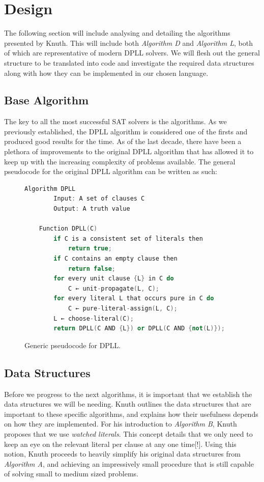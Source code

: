 \documentclass{article}
\begin{document}
\section{Design}
The following section will include analysing and detailing the algorithms presented by Knuth. This will include both
\textit{Algorithm D} and \textit{Algorithm L}, both of which are representative of modern DPLL solvers. We will flesh out the
general structure to be translated into code and investigate the required data structures along with how they can be implemented
in our chosen language.

\subsection{Base Algorithm}
The key to all the most successful SAT solvers is the algorithms. As we previously established, the DPLL algorithm is considered
one of the firsts and produced good results for the time. As of the last decade, there have been a plethora of improvements to the
original DPLL algorithm that has allowed it to keep up with the increasing complexity of problems available. The general
pseudocode for the original DPLL algorithm can be written as such:

\begin{figure}[h]
    \centering
    \begin{lstlisting}[language=C++]
    Algorithm DPLL
        Input: A set of clauses C
        Output: A truth value

    Function DPLL(C)
        if C is a consistent set of literals then
            return true;
        if C contains an empty clause then
            return false;
        for every unit clause {L} in C do
            C ← unit-propagate(L, C);
        for every literal L that occurs pure in C do
            C ← pure-literal-assign(L, C);
        L ← choose-literal(C);
        return DPLL(C AND {L}) or DPLL(C AND {not(L)});
    \end{lstlisting}
    \caption{Generic pseudocode for DPLL.}
\end{figure}

\subsection{Data Structures}
Before we progress to the next algorithms, it is important that we establish the data structures we will be needing. Knuth
outlines the data structures that are important to these specific algorithms, and explains how their usefulness depends on how
they are implemented. For his introduction to \textit{Algorithm B}, Knuth proposes that we use \textit{watched literals}. This
concept details that we only need to keep an eye on the relevant literal per clause at any one time[!]. Using this notion, Knuth
proceeds to heavily simplify his original data structures from \textit{Algorithm A}, and achieving an impressively small
procedure that is still capable of solving small to medium sized problems.
\end{document}
